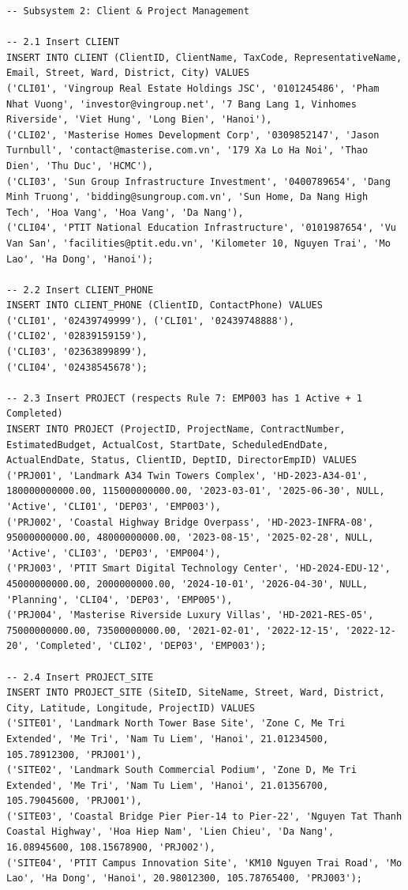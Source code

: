 \documentclass[a4paper,12pt]{report}
\begin{document}
\begin{lstlisting}
-- Subsystem 2: Client & Project Management

-- 2.1 Insert CLIENT
INSERT INTO CLIENT (ClientID, ClientName, TaxCode, RepresentativeName, Email, Street, Ward, District, City) VALUES
('CLI01', 'Vingroup Real Estate Holdings JSC', '0101245486', 'Pham Nhat Vuong', 'investor@vingroup.net', '7 Bang Lang 1, Vinhomes Riverside', 'Viet Hung', 'Long Bien', 'Hanoi'),
('CLI02', 'Masterise Homes Development Corp', '0309852147', 'Jason Turnbull', 'contact@masterise.com.vn', '179 Xa Lo Ha Noi', 'Thao Dien', 'Thu Duc', 'HCMC'),
('CLI03', 'Sun Group Infrastructure Investment', '0400789654', 'Dang Minh Truong', 'bidding@sungroup.com.vn', 'Sun Home, Da Nang High Tech', 'Hoa Vang', 'Hoa Vang', 'Da Nang'),
('CLI04', 'PTIT National Education Infrastructure', '0101987654', 'Vu Van San', 'facilities@ptit.edu.vn', 'Kilometer 10, Nguyen Trai', 'Mo Lao', 'Ha Dong', 'Hanoi');

-- 2.2 Insert CLIENT_PHONE
INSERT INTO CLIENT_PHONE (ClientID, ContactPhone) VALUES
('CLI01', '02439749999'), ('CLI01', '02439748888'),
('CLI02', '02839159159'),
('CLI03', '02363899899'),
('CLI04', '02438545678');

-- 2.3 Insert PROJECT (respects Rule 7: EMP003 has 1 Active + 1 Completed)
INSERT INTO PROJECT (ProjectID, ProjectName, ContractNumber, EstimatedBudget, ActualCost, StartDate, ScheduledEndDate, ActualEndDate, Status, ClientID, DeptID, DirectorEmpID) VALUES
('PRJ001', 'Landmark A34 Twin Towers Complex', 'HD-2023-A34-01', 180000000000.00, 115000000000.00, '2023-03-01', '2025-06-30', NULL, 'Active', 'CLI01', 'DEP03', 'EMP003'),
('PRJ002', 'Coastal Highway Bridge Overpass', 'HD-2023-INFRA-08', 95000000000.00, 48000000000.00, '2023-08-15', '2025-02-28', NULL, 'Active', 'CLI03', 'DEP03', 'EMP004'),
('PRJ003', 'PTIT Smart Digital Technology Center', 'HD-2024-EDU-12', 45000000000.00, 2000000000.00, '2024-10-01', '2026-04-30', NULL, 'Planning', 'CLI04', 'DEP03', 'EMP005'),
('PRJ004', 'Masterise Riverside Luxury Villas', 'HD-2021-RES-05', 75000000000.00, 73500000000.00, '2021-02-01', '2022-12-15', '2022-12-20', 'Completed', 'CLI02', 'DEP03', 'EMP003');

-- 2.4 Insert PROJECT_SITE
INSERT INTO PROJECT_SITE (SiteID, SiteName, Street, Ward, District, City, Latitude, Longitude, ProjectID) VALUES
('SITE01', 'Landmark North Tower Base Site', 'Zone C, Me Tri Extended', 'Me Tri', 'Nam Tu Liem', 'Hanoi', 21.01234500, 105.78912300, 'PRJ001'),
('SITE02', 'Landmark South Commercial Podium', 'Zone D, Me Tri Extended', 'Me Tri', 'Nam Tu Liem', 'Hanoi', 21.01356700, 105.79045600, 'PRJ001'),
('SITE03', 'Coastal Bridge Pier Pier-14 to Pier-22', 'Nguyen Tat Thanh Coastal Highway', 'Hoa Hiep Nam', 'Lien Chieu', 'Da Nang', 16.08945600, 108.15678900, 'PRJ002'),
('SITE04', 'PTIT Campus Innovation Site', 'KM10 Nguyen Trai Road', 'Mo Lao', 'Ha Dong', 'Hanoi', 20.98012300, 105.78765400, 'PRJ003');


\end{lstlisting}
\end{document}
